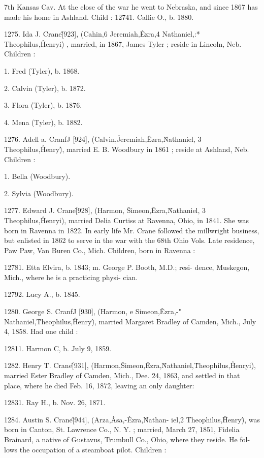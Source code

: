 7th Kansas Cav. At the close of the war he went to Nebraska, 
and since 1867 has made his home in Ashland. Child : 
12741. Callie O., b. 1880. 

1275. Ida J. Crane\^ [923], (Cahin,6 Jeremiah,\^ Ezra,4 
Nathaniel,:* Theophilus,\^ Henryi) , married, in 1867, James Tyler ; 
reside in Lincoln, Neb. Children : 

1. Fred (Tyler), b. 1868. 

2. Calvin (Tyler), b. 1872. 

3. Flora (Tyler), b. 1876. 

4. Mena (Tyler), b. 1882. 

1276. Adell a. CranfJ [924], (Calvin,\^ Jeremiah,\^ Ezra,\^ 
Nathaniel, 3 Theophilus,\^ Henry\^), married E. B. Woodbury in 
1861 ; reside at Ashland, Neb. Children : 

1. Bella (Woodbury). 

2. Sylvia (Woodbury). 

1277. Edward J. Crane\^ [928], (Harmon, \^ Simeon,\^ Ezra,\^ 
Nathaniel, 3 Theophilus,\^ Henryi), married Delia Curtiss at 
Ravenna, Ohio, in 1841. She was born in Ravenna in 1822. 
In early life Mr. Crane followed the millwright business, but 
enlisted in 1862 to serve in the war with the 68th Ohio Vols. 
Late residence, Paw Paw, Van Buren Co., Mich. Children, born 
in Ravenna : 

12781. Etta Elvira, b. 1843; m. George P. Booth, M.D.; resi- 
dence, Muskegon, Mich., where he is a practicing physi- 
cian. 

12792. Lucy A., b. 1845. 

1280. George S. CranfJ [930], (Harmon, e Simeon,\^ Ezra,-" 
Nathaniel,\^ Theophilus,\^ Henry\^), married Margaret Bradley of 
Camden, Mich., July 4, 1858. Had one child : 

12811. Harmon C, b. July 9, 1859. 

1282. Henry T. Crane\^ [931], (Harmon,\^ Simeon,\^ Ezra,\^ 
Nathaniel,\^ Theophilus,\^ Henryi), married Ester Bradley of 
Camden, Mich., Dee. 24, 1863, and settled in that place, where 
he died Feb. 16, 1872, leaving an only daughter: 

12831. Ray H., b. Nov. 26, 1871. 

1284. Austin S. Crane\^ [944], (Arza,\^ Asa,-\^ Ezra,\^ Nathan- 
iel,2 Theophilus,\^ Henry\^), was born in Canton, St. Lawrence 
Co., N. Y. ; married, March 27, 1851, Fidelia Brainard, a native 
of Gustavus, Trumbull Co., Ohio, where they reside. He fol- 
lows the occupation of a steamboat pilot. Children : 

